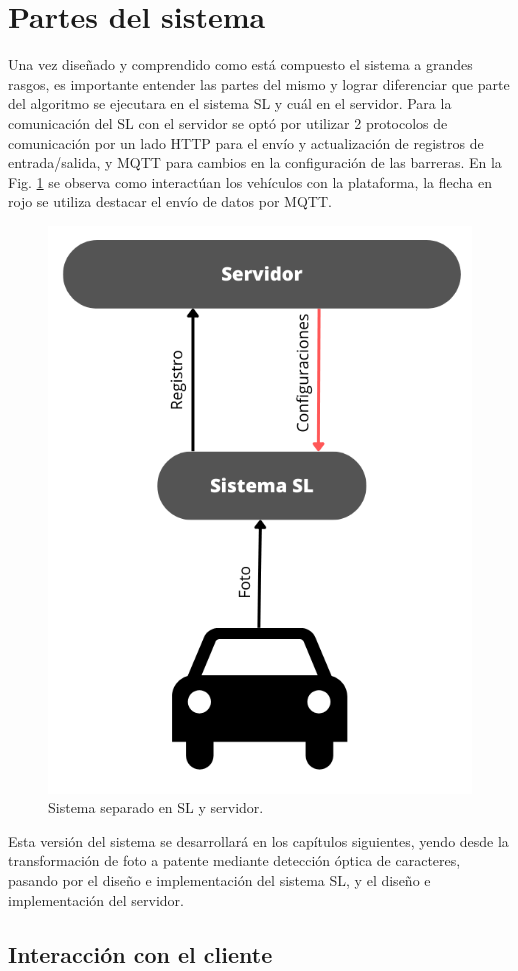 \section{Partes del sistema}

Una vez diseñado y comprendido como está compuesto el sistema a grandes rasgos, es importante entender las partes del mismo y lograr diferenciar que parte del algoritmo se ejecutara en el sistema SL y cuál en el servidor. Para la comunicación del SL con el servidor se optó por utilizar 2 protocolos de comunicación por un lado HTTP para el envío y actualización de registros de entrada/salida, y MQTT para cambios en la configuración de las barreras.
En la Fig. \ref{fig:sistema-server-barrera} se observa como interactúan los vehículos con la plataforma, la flecha en rojo se utiliza destacar el envío de datos por MQTT.
\begin{figure}[h]
    \centering
    \includegraphics[width=.3\textwidth]{imgs/sistema-server-barrera}
    \caption{Sistema separado en SL y servidor.}
    \label{fig:sistema-server-barrera}
\end{figure}

Esta versión del sistema se desarrollará en los capítulos siguientes, yendo desde la transformación de foto a patente mediante detección óptica de caracteres, pasando por el diseño e implementación del sistema SL, y el diseño e implementación del servidor.

\subsection{Interacción con el cliente}

